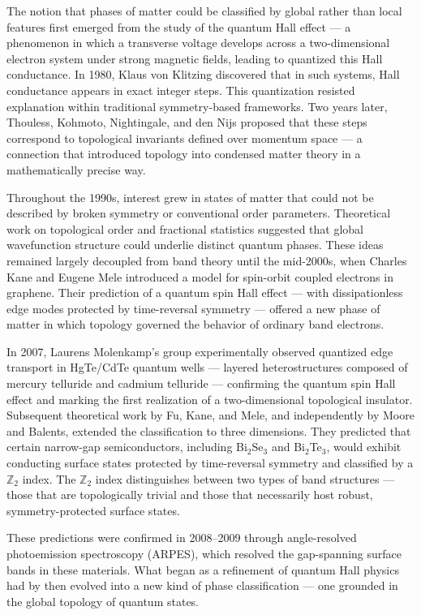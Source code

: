 \begin{historical}
The notion that phases of matter could be classified by global rather than local features first emerged from the study of the quantum Hall effect — a phenomenon in which a transverse voltage develops across a two-dimensional electron system under strong magnetic fields, leading to quantized this Hall conductance. In 1980, Klaus von Klitzing discovered that in such systems, Hall conductance appears in exact integer steps. This quantization resisted explanation within traditional symmetry-based frameworks. Two years later, Thouless, Kohmoto, Nightingale, and den Nijs proposed that these steps correspond to topological invariants defined over momentum space — a connection that introduced topology into condensed matter theory in a mathematically precise way.

Throughout the 1990s, interest grew in states of matter that could not be described by broken symmetry or conventional order parameters. Theoretical work on topological order and fractional statistics suggested that global wavefunction structure could underlie distinct quantum phases. These ideas remained largely decoupled from band theory until the mid-2000s, when Charles Kane and Eugene Mele introduced a model for spin-orbit coupled electrons in graphene. Their prediction of a quantum spin Hall effect — with dissipationless edge modes protected by time-reversal symmetry — offered a new phase of matter in which topology governed the behavior of ordinary band electrons.

In 2007, Laurens Molenkamp’s group experimentally observed quantized edge transport in HgTe/CdTe quantum wells — layered heterostructures composed of mercury telluride and cadmium telluride — confirming the quantum spin Hall effect and marking the first realization of a two-dimensional topological insulator. Subsequent theoretical work by Fu, Kane, and Mele, and independently by Moore and Balents, extended the classification to three dimensions. They predicted that certain narrow-gap semiconductors, including Bi\(_2\)Se\(_3\) and Bi\(_2\)Te\(_3\), would exhibit conducting surface states protected by time-reversal symmetry and classified by a \(\mathbb{Z}_2\) index. The \(\mathbb{Z}_2\) index distinguishes between two types of band structures — those that are topologically trivial and those that necessarily host robust, symmetry-protected surface states.

These predictions were confirmed in 2008–2009 through angle-resolved photoemission spectroscopy (ARPES), which resolved the gap-spanning surface bands in these materials. What began as a refinement of quantum Hall physics had by then evolved into a new kind of phase classification — one grounded in the global topology of quantum states.
\end{historical}
